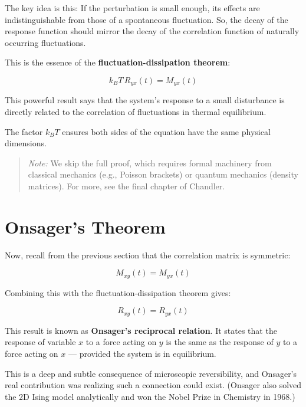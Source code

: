 \documentclass[
  letterpaper,
  enabledeprecatedfontcommands]{report}
\begin{document}
The key idea is this: If the perturbation is small enough, its effects
are indistinguishable from those of a spontaneous fluctuation. So, the
decay of the response function should mirror the decay of the
correlation function of naturally occurring fluctuations.

This is the essence of the \textbf{fluctuation-dissipation theorem}:

\[
k_B T \, R_{yx}(t) = M_{yx}(t)
\]

This powerful result says that the system's response to a small
disturbance is directly related to the correlation of fluctuations in
thermal equilibrium.

The factor \(k_B T\) ensures both sides of the equation have the same
physical dimensions.

\begin{quote}
\emph{Note:} We skip the full proof, which requires formal machinery
from classical mechanics (e.g., Poisson brackets) or quantum mechanics
(density matrices). For more, see the final chapter of Chandler.
\end{quote}

\section{Onsager's Theorem}\label{onsagers-theorem}

Now, recall from the previous section that the correlation matrix is
symmetric:

\[
M_{xy}(t) = M_{yx}(t)
\]

Combining this with the fluctuation-dissipation theorem gives:

\[
R_{xy}(t) = R_{yx}(t)
\]

This result is known as \textbf{Onsager's reciprocal relation}. It
states that the response of variable \(x\) to a force acting on \(y\) is
the same as the response of \(y\) to a force acting on \(x\) ---
provided the system is in equilibrium.

This is a deep and subtle consequence of microscopic reversibility, and
Onsager's real contribution was realizing such a connection could exist.
(Onsager also solved the 2D Ising model analytically and won the Nobel
Prize in Chemistry in 1968.)
\end{document}
